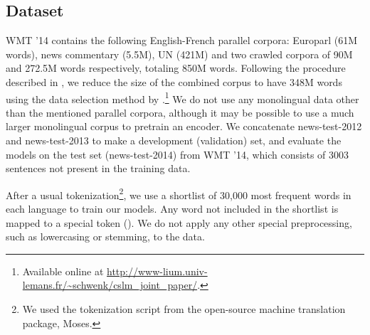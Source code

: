 \subsection{Dataset}

WMT '14 contains the following English-French parallel corpora: Europarl (61M
words), news commentary (5.5M), UN (421M) and two crawled corpora of 90M and
272.5M words respectively, totaling 850M words. 
Following the procedure described
in \citet{Cho2014}, we reduce the size of the combined corpus to have 348M words
using the data selection method by \citet{Axelrod2011}.\footnote{
    Available online at
    \url{http://www-lium.univ-lemans.fr/~schwenk/cslm_joint_paper/}.
} We do not use any monolingual data other than the mentioned parallel corpora,
although it may be possible to use a much larger monolingual corpus to pretrain
an encoder. We concatenate news-test-2012 and news-test-2013 to make a
development (validation) set, and evaluate the models on the test set
(news-test-2014) from WMT '14, which consists of 3003 sentences not present in
the training data. 

After a usual tokenization\footnote{
    We used the tokenization script from the open-source machine translation
    package, Moses. 
}, 
we use a shortlist of 30,000 most frequent words in each language to train our
models. Any word not included in the shortlist is mapped to a special token
(). We do not apply any other special preprocessing,
such as lowercasing or stemming, to the data.

